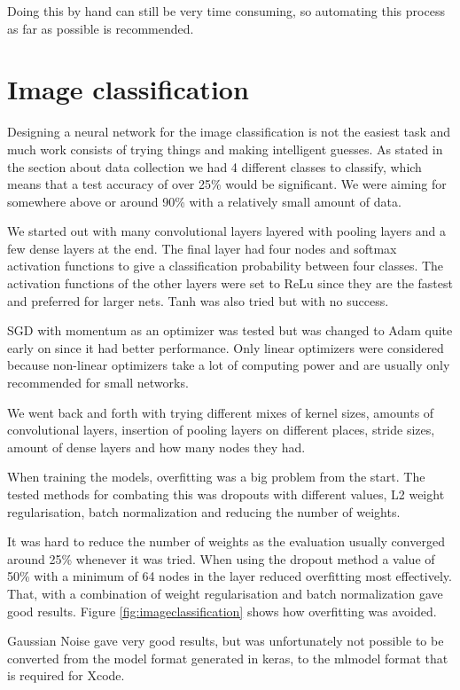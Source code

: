 Doing this by hand can still be very time consuming, so automating this process as far as possible is recommended.

\section{Image classification}
\label{sec:NNclassification}
Designing a neural network for the image classification is not the easiest task and much
work consists of trying things and making intelligent guesses.
As stated in the section about data collection we had 4 different classes to classify,
which means that a test accuracy of over 25\% would be significant. We were aiming for
somewhere above or around 90\% with a relatively small amount of data.

We started out with many convolutional layers layered with pooling layers and a few dense
layers at the end. The final layer had four nodes and softmax activation functions to give a
classification probability between four classes.
The activation functions of the other layers were set to ReLu since they are the fastest
and preferred for larger nets. Tanh was also tried but with no success.

SGD with momentum as an optimizer was tested but was changed to Adam
quite early on since it had better performance.
Only linear optimizers were considered because non-linear optimizers take a lot of
computing power and are usually only recommended for small networks.

We went back and forth with trying different mixes of kernel sizes, amounts of convolutional
layers, insertion of pooling layers on different places, stride sizes, amount of dense layers
and how many nodes they had.

When training the models, overfitting was a big problem from the start. The tested methods
for combating this was dropouts with different values, L2 weight regularisation,
batch normalization and reducing the number of weights.

It was hard to reduce the number of weights as the evaluation usually converged around 25\%
whenever it was tried.
When using the dropout method a value of 50\% with a minimum of 64 nodes in the layer
reduced overfitting most effectively. That, with a combination of weight regularisation and batch 
normalization gave good results. Figure \ref{fig:imageclassification} shows how overfitting was avoided.

Gaussian Noise gave very good results, but was unfortunately not possible to be 
converted from the model format generated in keras, to the mlmodel format that is required for Xcode.

